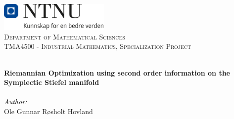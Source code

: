 
\begin{titlepage}
\vbox{ }
\vbox{ }
\begin{center}
\includegraphics[width=0.40\textwidth]{Images/NTNU_logo.png}\\[1cm]
\textsc{\LARGE Department of Mathematical Sciences}\\[1.5cm]
\textsc{\Large TMA4500 - Industrial Mathematics, Specialization Project }\\[0.5cm]
\vbox{ }

\HRule \\[0.4cm]
{ \huge \bfseries Riemannian Optimization using second order information on the Symplectic Stiefel manifold}\\[0.4cm]
\HRule \\[1.5cm]

\large
\emph{Author:}\\
Ole Gunnar Røsholt Hovland
\vfill

\end{center}
\end{titlepage}